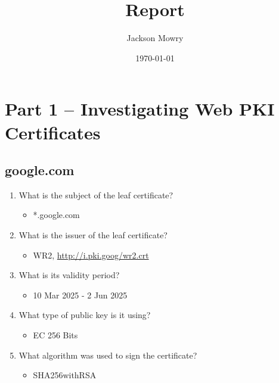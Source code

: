 \documentclass[11pt]{article}
\author{Jackson Mowry}
\date{\today}
\title{Report}
\begin{document}
\maketitle
\tableofcontents

\section{Part 1 -- Investigating Web PKI Certificates}
\label{sec:org64de6df}
\subsection{google.com}
\label{sec:org95df4dd}
\begin{enumerate}
\item What is the subject of the leaf certificate?
\begin{itemize}
\item *.google.com
\end{itemize}
\item What is the issuer of the leaf certificate?
\begin{itemize}
\item WR2, \url{http://i.pki.goog/wr2.crt}
\end{itemize}
\item What is its validity period?
\begin{itemize}
\item 10 Mar 2025 - 2 Jun 2025
\end{itemize}
\item What type of public key is it using?
\begin{itemize}
\item EC 256 Bits
\end{itemize}
\item What algorithm was used to sign the certificate?
\begin{itemize}
\item SHA256withRSA
\end{itemize}
\end{enumerate}
\end{document}
